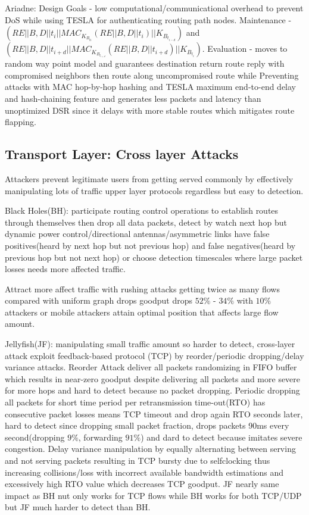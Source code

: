 \documentclass[9pt]{extarticle}
\begin{document}
\begin{multicols}{2}
Ariadne: Design Goals - low computational/communicational overhead to prevent DoS while using TESLA for authenticating routing path nodes. Maintenance - $(RE||B,D||t_i||MAC_{K_{B_{ti}}}(RE||B,D||t_i)||K_{B_{t_{i-d}}})$ and $(RE||B,D||t_{i+d}||MAC_{K_{B_{t_{i+d}}}}(RE||B,D||t_{i+d})||K_{B_{t_i}})$. Evaluation - moves to random way point model and guarantees destination return route reply with compromised neighbors then route along uncompromised
route while Preventing attacks with MAC hop-by-hop
hashing and TESLA maximum end-to-end delay and hash-chaining feature and generates less packets and latency than unoptimized DSR since it delays with more stable routes which mitigates route flapping. 

\subsection{Transport Layer: Cross layer Attacks}

Attackers prevent legitimate users from getting served commonly by effectively manipulating lots of traffic upper layer protocols regardless but easy to detection.

Black Holes(BH): participate routing control operations to establish routes through themselves then drop all data packets, detect by watch next hop but dynamic power control/directional antennas/asymmetric links have false positives(heard by next hop but not previous hop) and false negatives(heard by previous hop but not next hop) or choose detection timescales where large packet losses needs more affected traffic.

Attract more affect traffic with rushing attacks getting twice as many flows compared with uniform graph drops goodput drops $52\%$ - $34\%$ with $10\%$ attackers or mobile attackers attain optimal position that affects large flow amount.

Jellyfish(JF): manipulating small traffic amount so harder to detect, cross-layer attack exploit feedback-based protocol (TCP) by reorder/periodic dropping/delay variance attacks. Reorder Attack deliver all packets randomizing in FIFO buffer which results in near-zero goodput despite delivering all packets and more severe for more hops and hard to detect because no packet dropping. Periodic dropping all packets for short time period per retransmission time-out(RTO) has consecutive packet losses means TCP timeout and drop again RTO seconds later, hard to detect since dropping small packet fraction, drops packets 90ms every second(dropping $9\%$, forwarding $91\%$) and dard to detect because imitates severe congestion. Delay variance manipulation by equally alternating between serving and not serving packets resulting in TCP bursty due to selfclocking thus increasing collisions/loss with incorrect available bandwidth estimations and excessively high RTO value which decreases TCP goodput. JF nearly same impact as BH nut only works for TCP flows while BH works for both TCP/UDP but JF much harder to detect than BH.


\end{multicols}
\end{document}
